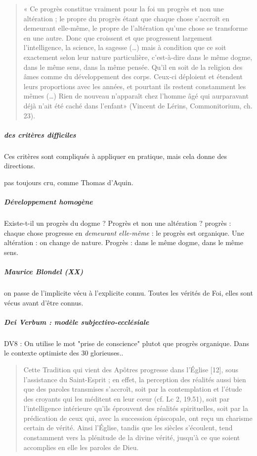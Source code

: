       \begin{quote}
          «  Ce  progrès  constitue  vraiment  pour  la  foi  un  progrès  et  non  une  altération  ;  le  propre  du progrès  étant  que  chaque  chose  s’accroît  en  demeurant  elle-même,  le  propre  de  l’altération qu’une  chose  se  transforme  en  une  autre.  Donc  que  croissent  et  que  progressent  largement l’intelligence,  la  science,  la  sagesse  (…)  mais  à  condition    que  ce  soit  exactement  selon  leur nature  particulière,  c’est-à-dire  dans  le  même  dogme,  dans  le  même  sens,  dans  la  même pensée.  Qu’il  en  soit  de  la  religion  des  âmes  comme  du  développement  des  corps.  Ceux-ci déploient  et  étendent  leurs  proportions  avec  les  années,  et  pourtant  ils  restent  constamment  les mêmes  (…)  Rien  de  nouveau  n’apparaît  chez  l’homme  âgé  qui  aurparavant  déjà  n’ait  été caché  dans  l’enfant»  (Vincent  de  Lérins,  Commonitorium, ch. 23).   
      \end{quote}
      \subparagraph{des critères difficiles} Ces critères sont compliqués à appliquer en pratique, mais cela donne des directions. 
      \begin{Ex}
        pas toujours cru, comme Thomas d'Aquin.
      \end{Ex}
  
      \subparagraph{Développement homogène} Existe-t-il un progrès du dogme ? Progrès et non une altération ? progrès : chaque chose progresse en \textit{demeurant elle-même} : le progrès est organique. Une altération : on change de nature. Progrès : dans le même dogme, dans le même sens.
      
      \subparagraph{Maurice Blondel (XX) } on passe de l'implicite vécu à l'explicite connu. Toutes les vérités de Foi, elles sont vécus avant d'être connus. 
      
      \subparagraph{Dei Verbum : modèle subjectivo-ecclésiale} DV8 : On utilise le mot "prise de conscience" plutot que progrès organique. Dans le contexte optimiste des 30 glorieuses..
      \begin{quote}
Cette Tradition qui vient des Apôtres progresse dans l’Église [12], sous l’assistance du Saint-Esprit ; en effet, la perception des réalités aussi bien que des paroles transmises s’accroît, soit par la contemplation et l’étude des croyants qui les méditent en leur cœur (cf. Lc 2, 19.51), soit par l’intelligence intérieure qu’ils éprouvent des réalités spirituelles, soit par la prédication de ceux qui, avec la succession épiscopale, ont reçu un charisme certain de vérité. Ainsi l’Église, tandis que les siècles s’écoulent, tend constamment vers la plénitude de la divine vérité, jusqu’à ce que soient accomplies en elle les paroles de Dieu.
      \end{quote}
 
